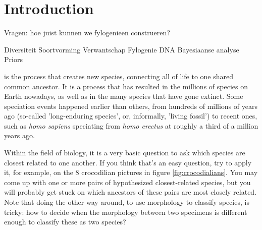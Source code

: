 \chapter{Introduction}
\label{chapter_introduction}




Vragen: hoe juist kunnen we fylogenieen construeren?

Diversiteit
Soortvorming
Verwantschap
Fylogenie
DNA
Bayesiaanse analyse
Priors









\newpage

\noindent 
{} is the process that creates new species,
connecting all of life to one shared common ancestor. It is a process
that has resulted in the millions of species on Earth nowadays, 
as well as in the many species that have gone extinct. 
Some speciation events happened earlier than others,
from hundreds of millions of years ago (so-called 'long-enduring species',
or, informally, 'living fossil') 
to recent ones, such as \textit{homo sapiens} speciating 
from \textit{homo erectus} at roughly a third of a million years ago.

Within the field of biology, it is a very basic question 
to ask which species are closest related to
one another. If you think that's an easy question, try to apply it, 
for example, on the 8 crocodilian pictures in figure \ref{fig:crocodialians}.
You may come up with one or more pairs of hypothesized closest-related species,
but you will probably get stuck on which ancestors of these pairs
are most closely related. Note that doing the other way around, to use
morphology to classify species, is tricky: how to decide when the morphology 
between two specimens is different enough to classify these as two species?

